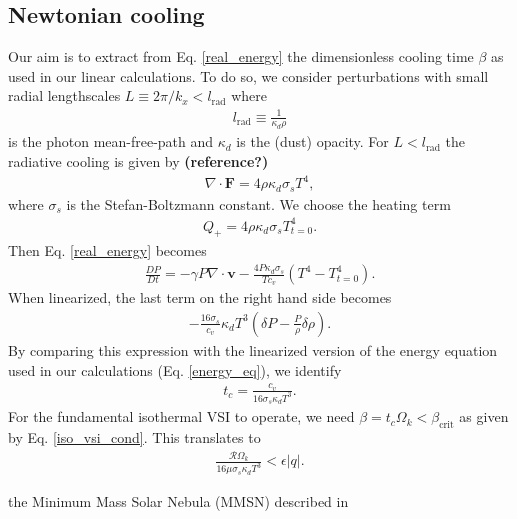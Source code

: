 \subsection{Newtonian cooling}
Our aim is to extract from Eq. \ref{real_energy} the dimensionless
cooling time $\beta$ as used in our linear calculations. To do so, we
consider perturbations with small radial lengthscales $L\equiv
2\pi/k_x<l_\mathrm{rad}$ where 
\begin{align}
l_\mathrm{rad} \equiv \frac{1}{\kappa_d\rho} 
\end{align} 
is the photon mean-free-path and $\kappa_d$ is the (dust) opacity. For
$L< l_\mathrm{rad}$ the radiative cooling is given by {\bf (reference?)}
\begin{align}
\nabla\cdot\bm{F} = 4 \rho \kappa_d \sigma_s T^4,
\end{align}   
where $\sigma_s$ is the Stefan-Boltzmann constant. We choose the
heating term 
\begin{align}
  Q_+ = 4\rho\kappa_d\sigma_s T^{4}_{t=0}. 
\end{align}
Then Eq. \ref{real_energy} becomes
\begin{align}
  \frac{DP}{Dt} = -\gamma P \nabla\cdot\bm{v} -
  \frac{4P\kappa_d\sigma_s}{Tc_v}\left(T^4 - T_{t=0}^4\right). 
\end{align}
When linearized, the last term on the right hand side becomes
\begin{align}
  -\frac{16\sigma_s}{c_v}\kappa_d T^3\left(\delta P -
    \frac{P}{\rho}\delta\rho\right). 
\end{align}
By comparing this expression with the linearized version of the energy
equation used in our calculations (Eq. \ref{energy_eq}), we identify 
\begin{align}
  t_c = \frac{c_v}{16\sigma_s\kappa_dT^3}.
\end{align}
For the fundamental isothermal VSI to operate, we need $\beta =
t_c\Omega_k< \beta_\mathrm{crit}$ as given by
Eq. \ref{iso_vsi_cond}. This translates to
\begin{align} 
  \frac{\mathcal{R}\Omega_k}{16\mu\sigma_s\kappa_dT^3} < \epsilon|q|. 
\end{align}




the Minimum Mass Solar Nebula (MMSN) described in \cite{chiang10}

